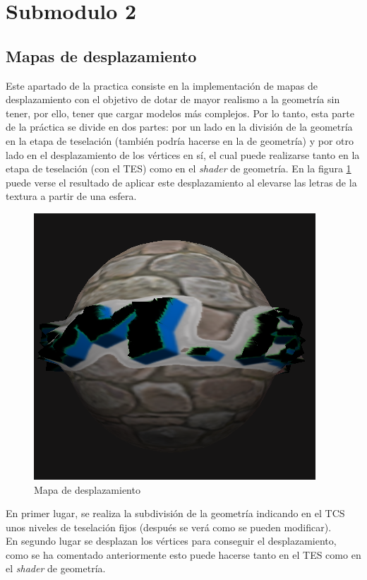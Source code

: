 \documentclass[10pt,oneside,a4paper]{article}
\begin{document}
\section{Submodulo 2}
\subsection{Mapas de desplazamiento}
Este apartado de la practica consiste en la implementación de mapas de desplazamiento con el objetivo de dotar de mayor realismo a la geometría sin tener, por ello, tener que cargar modelos más complejos. Por lo tanto, esta parte de la práctica se divide en dos partes: por un lado en la división de la geometría en la etapa de teselación (también podría hacerse en la de geometría) y por otro lado en el desplazamiento de los vértices en sí, el cual puede realizarse tanto en la etapa de teselación (con el TES) como en el \textit{shader} de geometría. En la figura \ref{fig:disp} puede verse el resultado de aplicar este desplazamiento al elevarse las letras de la textura a partir de una esfera. \\

\begin{figure}[!htb]
\centering
\includegraphics[width=.6\linewidth]{pgatrimgs/Displacement.png}
\caption{Mapa de desplazamiento}
\label{fig:disp}
\end{figure}

En primer lugar, se realiza la subdivisión de la geometría indicando en el TCS unos niveles de teselación fijos (después se verá como se pueden modificar).\\

En segundo lugar se desplazan los vértices para conseguir el desplazamiento, como se ha comentado anteriormente esto puede hacerse tanto en el TES como en el \textit{shader} de geometría.\\
\end{document}
